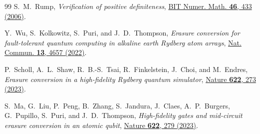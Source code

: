 \documentclass[aps,prx,reprint,nofootinbib,longbibliography,floatfix]{revtex4-2}
\theoremstyle{plain}
\theoremstyle{remark}
\begin{document}
\begin{thebibliography}{99}
S.~M.~Rump,
\emph{Verification of positive definiteness},
\href{https://doi.org/10.1007/s10543-006-0056-1}{BIT Numer. Math. \textbf{46}, 433 (2006)}.

Y.~Wu, S.~Kolkowitz, S.~Puri, and J.~D.~Thompson,
\emph{Erasure conversion for fault-tolerant quantum computing in alkaline earth Rydberg atom arrays},
\href{https://doi.org/10.1038/s41467-022-32094-6}{Nat. Commun. \textbf{13}, 4657 (2022)}.

P.~Scholl, A.~L.~Shaw, R.~B.-S.~Tsai, R.~Finkelstein, J.~Choi, and M.~Endres,
\emph{Erasure conversion in a high-fidelity Rydberg quantum simulator},
\href{https://doi.org/10.1038/s41586-023-06516-4}{Nature \textbf{622}, 273 (2023)}.

S.~Ma, G.~Liu, P.~Peng, B.~Zhang, S.~Jandura, J.~Claes, A.~P.~Burgers, G.~Pupillo, S.~Puri, and J.~D.~Thompson,
\emph{High-fidelity gates and mid-circuit erasure conversion in an atomic qubit},
\href{https://doi.org/10.1038/s41586-023-06438-1}{Nature \textbf{622}, 279 (2023)}.

\end{thebibliography}
\end{document}
